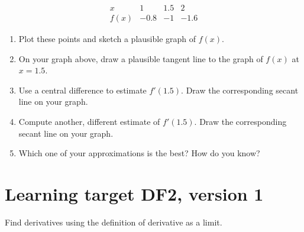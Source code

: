\[
\begin{array}{c||r|r|r}
      x  &  1 &  1.5   &  2 \\\hline
    f(x) & -0.8 & -1   & -1.6
\end{array}
\]
\begin{enumerate}[leftmargin=0pt]

\item Plot these points and sketch a plausible graph of $f(x)$.


\item On your graph above, draw a plausible tangent line to the graph of $f(x)$ at $x=1.5$.

\item Use a central difference to estimate $f'(1.5)$. Draw the corresponding secant line on your graph.
\vfill

\item Compute another, different estimate of $f'(1.5)$. Draw the corresponding secant line on your graph.

\vfill

\item Which one of your approximations is the best? How do you know?

\vspace{1cm}

\end{enumerate}
\pagebreak


\section{Learning target DF2, version 1}

Find derivatives using the definition of derivative as a limit.

\hrulefill

